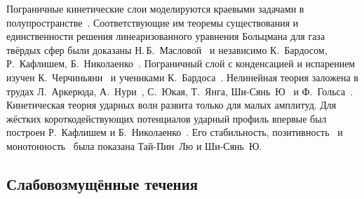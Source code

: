 Пограничные кинетические слои моделируются краевыми задачами в полупространстве~\cite{Grad1969}.
Соответствующие им теоремы существования и единственности решения линеаризованного уравнения Больцмана для газа твёрдых сфер
были доказаны Н.\,Б.~Масловой~\cite{Maslova1982} и независимо К.~Бардосом, Р.~Кафлишем, Б.~Николаенко~\cite{Bardos1986}.
Пограничный слой с конденсацией и испарением изучен К.~Черчиньяни~\cite{Cercignani1986}
и учениками К.~Бардоса~\cite{Coron1988}.
Нелинейная теория заложена в трудах Л.~Аркерюда, А.~Нури~\cite{Arkeryd2000},
С.~Юкая, Т.~Янга, Ши-Сянь~Ю~\cite{Ukai2003} и Ф.~Гольса~\cite{Golse2008}.
Кинетическая теория ударных волн развита только для малых амплитуд.
Для жёстких короткодействующих потенциалов ударный профиль впервые был построен Р.~Кафлишем и Б.~Николаенко~\cite{Caflisch1982}.
Его стабильность, позитивность~\cite{Liu2004} и монотонность~\cite{Liu2013} была показана Тай-Пин~Лю и Ши-Сянь~Ю.

\subsection{Слабовозмущённые течения}

